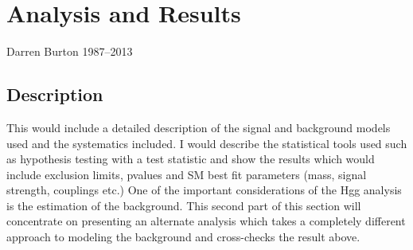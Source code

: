 \chapter{Analysis and Results}
\label{chap:results}
{Darren Burton 1987--2013}

\section{Description}

This would include a detailed description of the signal and background models used and the systematics included. I would describe the statistical tools used such as hypothesis testing with a test statistic and show the results which would include exclusion limits, pvalues and SM best fit parameters (mass, signal strength, couplings etc.)
One of the important considerations of the Hgg analysis is the estimation of the background. This second part of this section will concentrate on presenting an alternate analysis which takes a completely different approach to modeling the background and cross-checks the result above.
